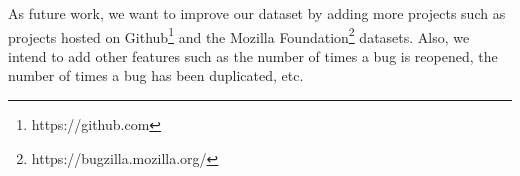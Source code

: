 \documentclass{sig-alternate-05-2015}
\begin{document}
As future work, we want to improve our dataset by
adding more projects such as projects hosted on Github\footnote{https://github.com} and the Mozilla
Foundation\footnote{https://bugzilla.mozilla.org/} datasets. Also, we intend to add other features
such as the number of times a bug is reopened, the number
of times a bug has been duplicated, etc.

%
%

%
%



%
\end{document}
